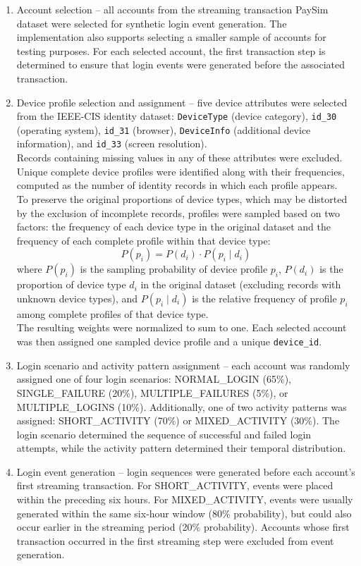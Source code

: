 \documentclass[titlepage]{article}
\begin{document}
\begin{enumerate}
    \item Account selection -- all accounts from the streaming transaction PaySim dataset were selected for synthetic login event generation. The implementation also supports selecting a smaller sample of accounts for testing purposes. For each selected account, the first transaction step is determined to ensure that login events were generated before the associated transaction.
    \item Device profile selection and assignment -- five device attributes were selected from the IEEE-CIS identity dataset: \texttt{DeviceType} (device category), \texttt{id\_30} (operating system), \texttt{id\_31} (browser), \texttt{DeviceInfo} (additional device information), and \texttt{id\_33} (screen resolution).\\
    Records containing missing values in any of these attributes were excluded. Unique complete device profiles were identified along with their frequencies, computed as the number of identity records in which each profile appears.\\
    To preserve the original proportions of device types, which may be distorted by the exclusion of incomplete records, profiles were sampled based on two factors: the frequency of each device type in the original dataset and the frequency of each complete profile within that device type:
    \[
        P(p_i) = P(d_i) \cdot P(p_i \mid d_i)
    \]
    where $P(p_i)$ is the sampling probability of device profile $p_i$, $P(d_i)$ is the proportion of device type $d_i$ in the original dataset (excluding records with unknown device types), and $P(p_i \mid d_i)$ is the relative frequency of profile $p_i$ among complete profiles of that device type.\\
    The resulting weights were normalized to sum to one. Each selected account was then assigned one sampled device profile and a unique \texttt{device\_id}.
    \item Login scenario and activity pattern assignment -- each account was randomly assigned one of four login scenarios: NORMAL\_LOGIN (65\%), SINGLE\_FAILURE (20\%), MULTIPLE\_FAILURES (5\%), or MULTIPLE\_LOGINS (10\%). Additionally, one of two activity patterns was assigned: SHORT\_ACTIVITY (70\%) or MIXED\_ACTIVITY (30\%). The login scenario determined the sequence of successful and failed login attempts, while the activity pattern determined their temporal distribution.
    \item Login event generation -- login sequences were generated before each account's first streaming transaction. For SHORT\_ACTIVITY, events were placed within the preceding six hours. For MIXED\_ACTIVITY, events were usually generated within the same six-hour window (80\% probability), but could also occur earlier in the streaming period (20\% probability). Accounts whose first transaction occurred in the first streaming step were excluded from event generation.

\end{enumerate}
\end{document}
